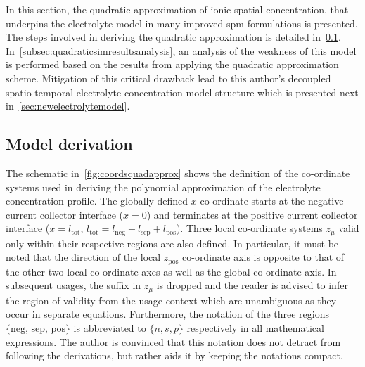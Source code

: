 
In   this    section,   the    quadratic   approximation   of    ionic   spatial
concentration,   that  underpins   the  electrolyte   model  in   many  improved
\gls{spm}  formulations  is  presented.  The  steps  involved  in  deriving  the
quadratic   approximation   is  detailed   in~\cref{subsec:quadraticmodelderiv}.
In~\cref{subsec:quadraticsimresultsanalysis},  an analysis  of  the weakness  of
this  model is  performed  based  on the  results  from  applying the  quadratic
approximation scheme. Mitigation of this critical drawback lead to this author's
decoupled  spatio-temporal electrolyte  concentration model  structure which  is
presented next in~\cref{sec:newelectrolytemodel}.

\subsection{Model derivation}\label{subsec:quadraticmodelderiv}

The  schematic  in~\cref{fig:coordsquadapprox}  shows   the  definition  of  the
co-ordinate  systems  used  in  deriving the  polynomial  approximation  of  the
electrolyte concentration  profile. The globally defined  $x$ co-ordinate starts
at  the negative  current  collector  interface ($x=0$)  and  terminates at  the
positive  current  collector  interface  ($x =  l_\text{tot},\,  l_\text{tot}  =
l_\text{neg} +  l_\text{sep} +  l_\text{pos}$). Three local  co-ordinate systems
$z_\mu$  valid  only  within  their  respective regions  are  also  defined.  In
particular, it  must be  noted that  the direction  of the  local $z_\text{pos}$
co-ordinate axis is opposite to that of  the other two local co-ordinate axes as
well as the global co-ordinate axis. In subsequent usages, the suffix in $z_\mu$
is dropped and  the reader is advised  to infer the region of  validity from the
usage  context  which are  unambiguous  as  they  occur in  separate  equations.
Furthermore, the  notation of  the three regions  $\{\text{neg, sep,  pos}\}$ is
abbreviated  to $\{n,s,p\}$  respectively in  all mathematical  expressions. The
author  is convinced  that this  notation does  not detract  from following  the
derivations, but rather aids it by keeping the notations compact.

